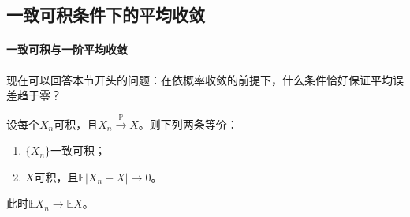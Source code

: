 \subsection{一致可积条件下的平均收敛}

\paragraph{一致可积与一阶平均收敛}
现在可以回答本节开头的问题：在依概率收敛的前提下，什么条件恰好保证平均误差趋于零？

\begin{theorem}[一致可积与一阶平均收敛]
\label{thm:conv-ui-l1}
设每个$X_n$可积，且$X_n\xrightarrow{\mathbb P}X$。则下列两条等价：
\begin{enumerate}
  \item $\{X_n\}$一致可积；
  \item $X$可积，且$\mathbb E|X_n-X|\to0$。
\end{enumerate}
此时$\mathbb EX_n\to\mathbb EX$。
\end{theorem}

